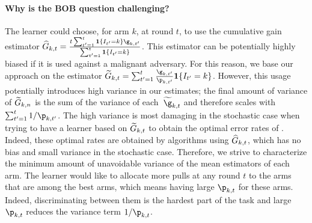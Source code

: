 \paragraph{Why is the BOB question challenging?}
The learner could choose, 
for arm $k$, at round $t$, to use the 
cumulative gain  estimator  $\estBiasCumulGain_{k,t} = 
\frac{t\sum_{t'=1}^{t}\indicator{\pulledArm_{t'}=k}\gainVector_{k,t'}}{\sum_{t'=1}^{t}\indicator{\pulledArm_{t'}=k}} 
$.
This estimator can be potentially highly biased if it is used against a 
malignant adversary. For this reason, we base our approach on 
the estimator $\estCumulGainVector_{k,t} = \sum_{t'=1}^{t}
\frac{\gainVector_{k,t'}}{\learnerDist_{k,t'}}\indicator{\pulledArm_{t'} = k}$.
However, this usage potentially introduces high variance in our estimates;
the final amount of variance of $\widetilde{G}_{k,n}$ 
is the sum of the variance of each~$\estGainVector_{k,t}$ and 
therefore scales with $\sum_{t'=1}^{t} 1/ \learnerDist_{k,t'}$.
The high variance is most damaging in the stochastic case when trying 
to have a learner based on $\widetilde{G}_{k,t}$ to obtain the 
optimal error rates of \cite{Karnin13AO}. Indeed, these 
optimal rates are obtained by algorithms using 
$\widehat{G}_{k,t}$, which has no bias and small 
variance in the stochastic case.
Therefore,  
we strive to characterize the minimum amount of 
unavoidable variance of the mean estimators of each arm.
The learner would like to allocate more pulls at any round $t$ 
to the arms that are among the best arms, which means having large 
$\learnerDist_{k,t}$ for these arms. Indeed,  discriminating 
between them is the hardest part of the task and large 
$\learnerDist_{k,t}$ reduces the variance term $1/\learnerDist_{k,t}$. 
